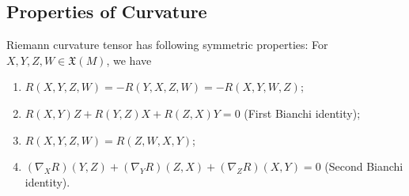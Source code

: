 \subsection*{Properties of Curvature}
\begin{prop}\label{curvature symmetric}
    Riemann curvature tensor has following symmetric properties:
    For $X,Y,Z,W\in\mathfrak{X}(M)$, we have
    \begin{enumerate}[(1)]
        \item $R(X,Y,Z,W)=-R(Y,X,Z,W)=-R(X,Y,W,Z)$;
        \item $R(X,Y)Z+R(Y,Z)X+R(Z,X)Y=0$ (First Bianchi identity);
        \item $R(X,Y,Z,W)=R(Z,W,X,Y)$;
        \item $(\nabla_XR)(Y,Z)+(\nabla_YR)(Z,X)+(\nabla_ZR)(X,Y)=0$ (Second Bianchi identity).
    \end{enumerate}
\end{prop}
